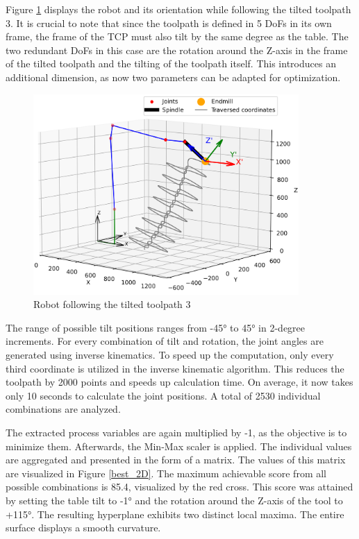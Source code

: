 Figure \ref{TP3_25_robot} displays the robot and its orientation while following the tilted toolpath 3. It is crucial to note that since the toolpath is defined in 5 \acrshort{DoF}s in its own frame, the frame of the \acrshort{TCP} must also tilt by the same degree as the table. The two redundant \acrshort{DoF}s in this case are the rotation around the Z-axis in the frame of the tilted toolpath and the tilting of the toolpath itself. This introduces an additional dimension, as now two parameters can be adapted for optimization.


\begin{figure}[H]
	\centerline{\includegraphics[width=0.9\textwidth]{figures/robotANDpath3_45.png}}
	\caption{Robot following the tilted toolpath 3}
	\label{TP3_25_robot}
\end{figure}

The range of possible tilt positions ranges from -45° to 45° in 2-degree increments. For every combination of tilt and rotation, the joint angles are generated using inverse kinematics. To speed up the computation, only every third coordinate is utilized in the inverse kinematic algorithm. This reduces the toolpath by 2000 points and speeds up calculation time. On average, it now takes only 10 seconds to calculate the joint positions. A total of 2530 individual combinations are analyzed.

The extracted process variables are again multiplied by -1, as the objective is to minimize them. Afterwards, the Min-Max scaler is applied. The individual values are aggregated and presented in the form of a matrix. The values of this matrix are visualized in Figure \ref{best_2D}. The maximum achievable score from all possible combinations is 85.4, visualized by the red cross. This score was attained by setting the table tilt to -1° and the rotation around the Z-axis of the tool to +115°. The resulting hyperplane exhibits two distinct local maxima. The entire surface displays a smooth curvature.


